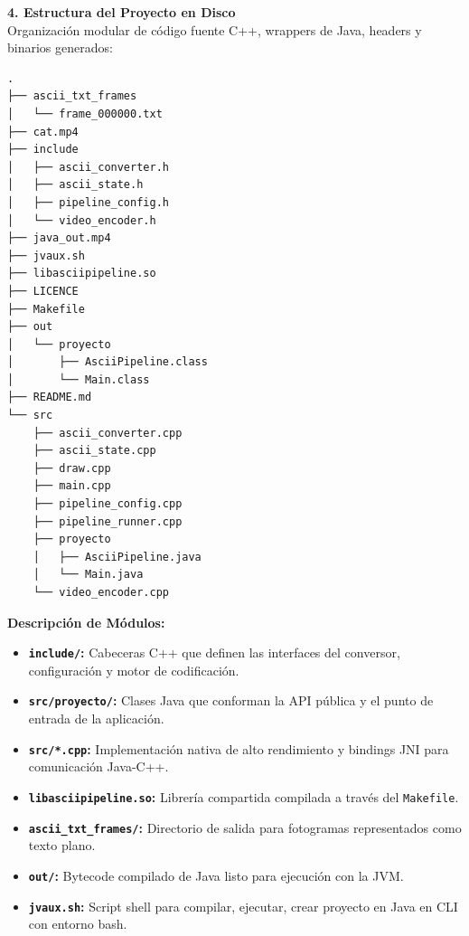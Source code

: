 \documentclass[12pt]{article}
\begin{document}
\newpage

\raggedright
{\Huge \bfseries 4. Estructura del Proyecto en Disco}\\[0.3cm]

\Large
Organización modular de código fuente C++, wrappers de Java, headers y binarios generados:

\vspace{0.2cm}
\begin{minipage}[t]{0.45\textwidth}
\begin{lstlisting}[style=treeStyle, basicstyle=\ttfamily\scriptsize]
.
├── ascii_txt_frames
│   └── frame_000000.txt
├── cat.mp4
├── include
│   ├── ascii_converter.h
│   ├── ascii_state.h
│   ├── pipeline_config.h
│   └── video_encoder.h
├── java_out.mp4
├── jvaux.sh
├── libasciipipeline.so
├── LICENCE
├── Makefile
├── out
│   └── proyecto
│       ├── AsciiPipeline.class
│       └── Main.class
├── README.md
└── src
    ├── ascii_converter.cpp
    ├── ascii_state.cpp
    ├── draw.cpp
    ├── main.cpp
    ├── pipeline_config.cpp
    ├── pipeline_runner.cpp
    ├── proyecto
    │   ├── AsciiPipeline.java
    │   └── Main.java
    └── video_encoder.cpp
\end{lstlisting}
\end{minipage}
\hfill
\begin{minipage}[t]{0.50\textwidth}
\large
\textbf{Descripción de Módulos:}
\vspace{0.2cm}
\begin{itemize}\small\setlength{\itemsep}{2pt}
    \item \textbf{\texttt{include/}:} Cabeceras C++ que definen las interfaces del conversor, configuración y motor de codificación.
    \item \textbf{\texttt{src/proyecto/}:} Clases Java que conforman la API pública y el punto de entrada de la aplicación.
    \item \textbf{\texttt{src/*.cpp}:} Implementación nativa de alto rendimiento y bindings JNI para comunicación Java-C++.
    \item \textbf{\texttt{libasciipipeline.so}:} Librería compartida compilada a través del \texttt{Makefile}.
    \item \textbf{\texttt{ascii\_txt\_frames/}:} Directorio de salida para fotogramas representados como texto plano.
    \item \textbf{\texttt{out/}:} Bytecode compilado de Java listo para ejecución con la JVM.
    \item \textbf{\texttt{jvaux.sh}:} Script shell para compilar, ejecutar, crear proyecto en Java en CLI con entorno bash.
\end{itemize}
\end{minipage}
\end{document}
